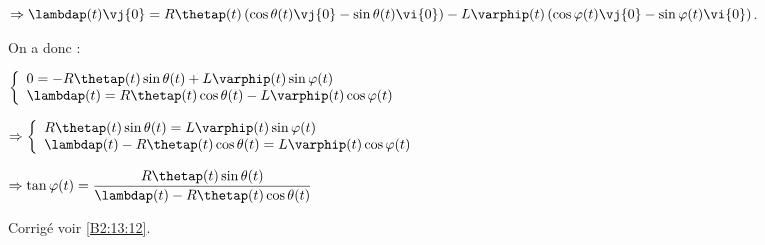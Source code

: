 $\Rightarrow \lambdap(t) \vj{0}= R\thetap(t) \left( \cos\theta(t)\vj{0}-\sin\theta(t)\vi{0} \right) - L\varphip(t)\left( \cos\varphi(t)\vj{0}-\sin\varphi(t)\vi{0}\right)$.

On a donc :

$
\left\{
\begin{array}{l}
0= -R\thetap(t) \sin\theta(t)  + L\varphip(t)\sin\varphi(t) \\
\lambdap(t) = R\thetap(t)  \cos\theta(t)- L\varphip(t)\cos\varphi(t)
\end{array}
\right.
$

$
\Rightarrow \left\{
\begin{array}{l}
R\thetap(t) \sin\theta(t)  = L\varphip(t)\sin\varphi(t) \\
\lambdap(t) - R\thetap(t)  \cos\theta(t)= L\varphip(t)\cos\varphi(t)
\end{array}
\right.
$

$\Rightarrow 
\tan \varphi(t) = \dfrac{R\thetap(t) \sin\theta(t) }{\lambdap(t) - R\thetap(t)  \cos\theta(t)}
$
\ifprof
\else
\fi


\ifprof
\else
\fi

\ifprof
\else
\fi


\ifprof
\else
\begin{flushright}
\footnotesize{Corrigé  voir \ref{B2:13:12}.}
\end{flushright}%
\fi